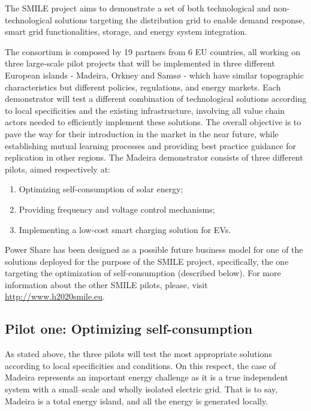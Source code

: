 The SMILE project aims to demonstrate a set of both technological and non-technological solutions targeting the distribution grid to enable demand response, smart grid functionalities, storage, and energy system integration.



The consortium is composed by 19 partners from 6 EU countries, all working on three large-scale pilot projects that will be implemented in three different European islands - Madeira, Orkney and Samsø - which have similar topographic characteristics but different policies, regulations, and energy markets. Each demonstrator will test a different combination of technological solutions according to local specificities and the existing infrastructure, involving all value chain actors needed to efficiently implement these solutions. The overall objective is to pave the way for their introduction in the market in the near future, while establishing mutual learning processes and providing best practice guidance for replication in other regions. The Madeira demonstrator consists of three different pilots, aimed respectively at:

\begin{enumerate}
\item Optimizing self-consumption of solar energy;
\item Providing frequency and voltage control mechanisms;
\item Implementing a low-cost smart charging solution for \acp{EV}.
\end{enumerate}

Power Share has been designed as a possible future business model for one of the solutions deployed for the purpose of the SMILE project, specifically, the one targeting the optimization of self-consumption (described below). For more information about the other SMILE pilots, please, visit \url{http://www.h2020smile.eu}.


\subsection{Pilot one: Optimizing self-consumption}

As stated above, the three pilots will test the most appropriate solutions according to local specificities and conditions. On this respect, the case of Madeira represents an important energy challenge as it is a true independent system with a small--scale and wholly isolated electric grid. That is to say, Madeira is a total energy island, and all the energy is generated locally.



